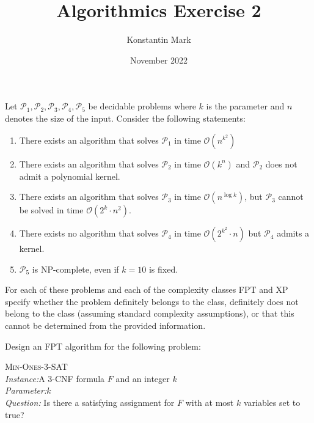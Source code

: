 \documentclass{article}
\title{Algorithmics Exercise 2}
\author{Konstantin Mark}
\date{November 2022}
\begin{document}
\maketitle


\listoftheorems[ignoreall,show={exercise}]

\newpage

\begin{exercise}
    Let $\mathcal P_1, \mathcal P_2, \mathcal P_3, \mathcal P_4, \mathcal P_5$ be decidable problems where $k$ is the parameter and $n$ denotes the size of the input. Consider the following statements:
    \begin{enumerate}
        \item There exists an algorithm that solves $\mathcal P_1$ in time $\mathcal O (n^{k^2})$
        \item There exists an algorithm that solves $\mathcal P_2$ in time $\mathcal O(k^n)$ and $\mathcal P_2$ does not admit a polynomial kernel.
        \item There exists an algorithm that solves $\mathcal P_3$ in time $\mathcal O(n^{\log k})$, but $\mathcal P_3$ cannot be solved in time $\mathcal O(2^k\cdot n^2)$.
        \item There exists no algorithm that solves $\mathcal P_4$ in time $\mathcal O(2^{k^2}\cdot n)$ but $\mathcal P_4$ admits a kernel.
        \item $\mathcal P_5$ is NP-complete, even if $k=10$ is fixed.
    \end{enumerate}
    For each of these problems and each of the complexity classes FPT and XP specify whether the problem definitely belongs to the class, definitely does not belong to the class (assuming standard complexity assumptions), or that this cannot be determined from the provided information.
\end{exercise}

\begin{solving}
    
\end{solving}


\newpage
\begin{exercise}
    Design an FPT algorithm for the following problem:
    \begin{mdframed} \textsc{Min-Ones-3-SAT} \\
        \textit{Instance:}A 3-CNF formula $F$ and an integer $k$\\
\textit{Parameter:}$k$\\
\textit{Question:} Is there a satisfying assignment for $F$ with at most $k$ variables set to true?
  \end{mdframed}
\end{exercise}
\end{document}
